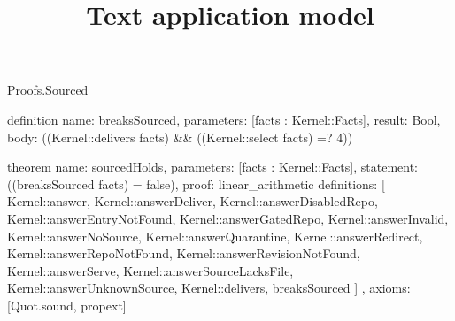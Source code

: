 \begin{lexlean}{Proofs.Sourced}
\title{Text application model}
\begin{semanticmodule}
definition{
  name: breaksSourced,
  parameters: [facts : Kernel::Facts],
  result: Bool,
  body: ((Kernel::delivers facts) && ((Kernel::select facts) =? 4))
}

theorem{
  name: sourcedHolds,
  parameters: [facts : Kernel::Facts],
  statement: ((breaksSourced facts) = false),
  proof: linear_arithmetic{
    definitions: [
      Kernel::answer,
      Kernel::answerDeliver,
      Kernel::answerDisabledRepo,
      Kernel::answerEntryNotFound,
      Kernel::answerGatedRepo,
      Kernel::answerInvalid,
      Kernel::answerNoSource,
      Kernel::answerQuarantine,
      Kernel::answerRedirect,
      Kernel::answerRepoNotFound,
      Kernel::answerRevisionNotFound,
      Kernel::answerServe,
      Kernel::answerSourceLacksFile,
      Kernel::answerUnknownSource,
      Kernel::delivers,
      breaksSourced
    ]
  },
  axioms: [Quot.sound, propext]
}
\end{semanticmodule}
\end{lexlean}
